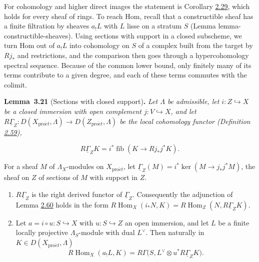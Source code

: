 \documentclass[11pt]{article}
\newenvironment{bpstatement}[2]{\par\addvspace{0.6\baselineskip}\noindent\textbf{#1}#2\textbf{.}\enspace\ignorespaces}
  {\par\addvspace{0.4\baselineskip}}
\newenvironment{bpstatementit}[2]{\begin{bpstatement}{#1}{#2}\itshape\ignorespaces}{\end{bpstatement}}
\providecommand{\fib}{}\renewcommand{\fib}{\operatorname{fib}}
\begin{document}
For cohomology and higher direct images the statement is Corollary \hyperref[bp86]{2.29}, which holds for every sheaf of rings. To reach Hom, recall that a constructible sheaf has a finite filtration by sheaves \(a_!L\) with \(L\) lisse on a stratum \(S\) (Lemma lemma-constructible-sheaves). Using sections with support in a closed subscheme, we turn Hom out of \(a_!L\) into cohomology on \(S\) of a complex built from the target by \(Rj_*\) and restrictions, and the comparison then goes through a hypercohomology spectral sequence. Because of the common lower bound, only finitely many of its terms contribute to a given degree, and each of these terms commutes with the colimit.

\label{bp257}%
\begin{bpstatementit}{Lemma~3.21}{ (Sections with closed support)}
Let \(\Lambda\) be admissible, let \(i:Z\hookrightarrow X\) be a closed immersion with open complement \(j:V\hookrightarrow X\), and let \(R\underline\Gamma_Z:D(X_{\mathrm{pro}\acute{e}t},\Lambda)\to D(Z_{\mathrm{pro}\acute{e}t},\Lambda)\) be the local cohomology functor (Definition \hyperref[bp184]{2.59}),

\[
R\underline\Gamma_Z K=i^*\fib(K\longrightarrow Rj_*j^*K).
\]

For a sheaf \(M\) of \(\Lambda_X\)-modules on \(X_{\mathrm{pro}\acute{e}t}\), let \(\underline\Gamma_Z(M)=i^*\ker(M\to j_*j^*M)\), the sheaf on \(Z\) of sections of \(M\) with support in \(Z\).

\begin{enumerate}
\item \(R\underline\Gamma_Z\) is the right derived functor of \(\underline\Gamma_Z\). Consequently the adjunction of Lemma \hyperref[bp185]{2.60} holds in the form \(R\!\operatorname{Hom}_X(i_*N,K)=R\!\operatorname{Hom}_Z(N,R\underline\Gamma_ZK)\).
\item Let \(a=i\circ u:S\hookrightarrow X\) with \(u:S\hookrightarrow Z\) an open immersion, and let \(L\) be a finite locally projective \(\Lambda_S\)-module with dual \(L^\vee\). Then naturally in \(K\in D(X_{\mathrm{pro}\acute{e}t},\Lambda)\) \[
   R\!\operatorname{Hom}_X(a_!L,K)
   =R\Gamma\bigl(S,L^\vee\otimes u^*R\underline\Gamma_ZK\bigr).
   \tag{3.1}
   \]
\end{enumerate}
\end{bpstatementit}
\end{document}
